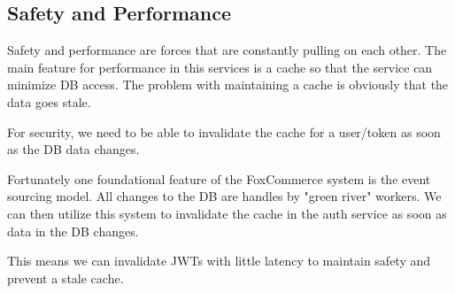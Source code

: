 \documentclass[11pt]{article}
\begin{document}
\subsection{Safety and Performance}

Safety and performance are forces that are constantly pulling on each other.
The main feature for performance in this services is a cache so that the service
can minimize DB access. The problem with maintaining a cache is obviously that
the data goes stale. 

For security, we need to be able to invalidate the cache for a user/token as 
soon as the DB data changes.

Fortunately one foundational feature of the FoxCommerce system is the event sourcing
model. All changes to the DB are handles by "green river" workers. We can then
utilize this system to invalidate the cache in the auth service as soon as data
in the DB changes.

This means we can invalidate JWTs with little latency to maintain safety and 
prevent a stale cache.
\end{document}
